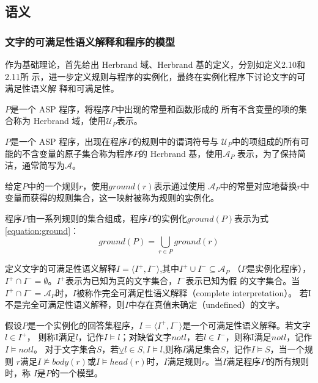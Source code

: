 \subsection{语义}
\subsubsection{文字的可满足性语义解释和程序的模型}
作为基础理论，首先给出 Herbrand 域、Herbrand 基的定义，分别如定义2.10和2.11所
示，进一步定义规则与程序的实例化，最终在实例化程序下讨论文字的可满足性语义解
释和可满足性。
\begin{definition}[Herbrand基]
    $P$是一个 ASP 程序，将程序$P$中出现的常量和函数形成的
    所有不含变量的项的集合称为 Herbrand 域，使用$\mathcal{U}_P$表示。
\end{definition}
\begin{definition}[Herbrand域]
    $P$是一个 ASP 程序，出现在程序$P$的规则中的谓词符号与
$\mathcal{U}_P$中的项组成的所有可能的不含变量的原子集合称为程序$P$的 Herbrand 基，使用$\mathcal{A}_P$
表示，为了保持简洁，通常简写为$\mathcal{A}$。
\end{definition}
\begin{definition}[规则的实例化]
    给定$P$中的一个规则$r$，使用$ground(r)$表示通过使用
$\mathcal{A}_P$中的常量对应地替换$r$中变量而获得的规则集合，这一映射被称为规则的实例化。
\end{definition}
\begin{definition}[程序的实例化]
    程序$P$由一系列规则的集合组成，程序$P$的实例化$ground(P)$表示为式\eqref{equation:ground}：
    \begin{equation}
    ground(P)=\bigcup_{r \in P}ground(r) \label{equation:ground}
    \end{equation}
\end{definition}
\begin{definition}[文字的可满足性语义解释]
    定义文字的可满足性语义解释$I=\langle I^+,I^- \rangle$,其中$I^+\cup I^-\subseteq \mathcal{A}_P$
    （$P$是实例化程序），$I^+\cap I^-=\emptyset$。$I^+$表示为已知为真的文字集合，$I^-$表示已知为假
    的文字集合。当$I^+\cap I^-=\mathcal{A}_P$时，$I$被称作完全可满足性语义解释（complete interpretation）。
    若I不是完全可满足性语义解释，则$I$中存在真值未确定（undefined）的文字。
\end{definition}
\begin{definition}[程序的模型]
    假设$P$是一个实例化的回答集程序，$I=\langle I^+,I^- \rangle$是一个可满足性语义解释。若文字$l \in I^+$，
    则称I满足$l$，记作$I\models l$；对缺省文字$not l$，若$l \in I^-$，则称I满足$not l$，记作$I\models not l$。
    对于文字集合$S$，若$\veebar l \in S,I \models l$,则称$I$满足集合$S$，记作$I \models S$，当一个规则
    $r$满足$I \nvDash body(r)$或$I \models head(r)$时，$I$满足规则$r$。当$I$满足程序$P$的所有规则时，称
    $I$是$P$的一个模型。
\end{definition}
